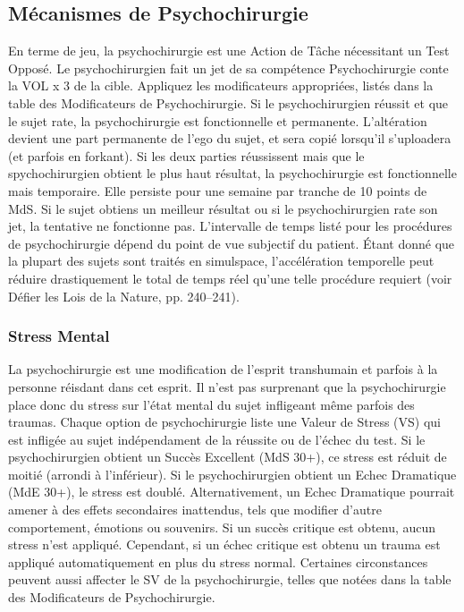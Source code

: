 \subsection{Mécanismes de Psychochirurgie} En terme de jeu, la psychochirurgie est une Action de Tâche nécessitant un Test Opposé. Le psychochirurgien fait un jet de sa compétence Psychochirurgie conte la VOL x 3 de la cible. Appliquez les modificateurs appropriées, listés dans la table des Modificateurs de Psychochirurgie. Si le psychochirurgien réussit et que le sujet rate, la psychochirurgie est fonctionnelle et permanente. L'altération devient une part permanente de l'ego du sujet, et sera copié lorsqu'il s'uploadera (et parfois en forkant). Si les deux parties réussissent mais que le spychochirurgien obtient le plus haut résultat, la psychochirurgie est fonctionnelle mais temporaire. Elle persiste pour une semaine par tranche de 10 points de MdS. Si le sujet obtiens un meilleur résultat ou si le psychochirurgien rate son jet, la tentative ne fonctionne pas. L'intervalle de temps listé pour les procédures de psychochirurgie dépend du point de vue subjectif du patient. Étant donné que la plupart des sujets sont traités en simulspace, l'accélération temporelle peut réduire drastiquement le total de temps réel qu'une telle procédure requiert (voir Défier les Lois de la Nature, pp. 240–241). 



\subsubsection{Stress Mental} La psychochirurgie est une modification de l'esprit transhumain et parfois à la personne réisdant dans cet esprit. Il n'est pas surprenant que la psychochirurgie place donc du stress sur l'état mental du sujet infligeant même parfois des traumas. Chaque option de psychochirurgie liste une Valeur de Stress (VS) qui est infligée au sujet indépendament de la réussite ou de l'échec du test. Si le psychochirurgien obtient un Succès Excellent (MdS 30+), ce stress est réduit de moitié (arrondi à l'inférieur). Si le psychochirurgien obtient un Echec Dramatique (MdE 30+), le stress est doublé. Alternativement, un Echec Dramatique pourrait amener à des effets secondaires inattendus, tels que modifier d'autre comportement, émotions ou souvenirs. Si un succès critique est obtenu, aucun stress n'est appliqué. Cependant, si un échec critique est obtenu un trauma est appliqué automatiquement en plus du stress normal. Certaines circonstances peuvent aussi affecter le SV de la psychochirurgie, telles que notées dans la table des Modificateurs de Psychochirurgie. 



